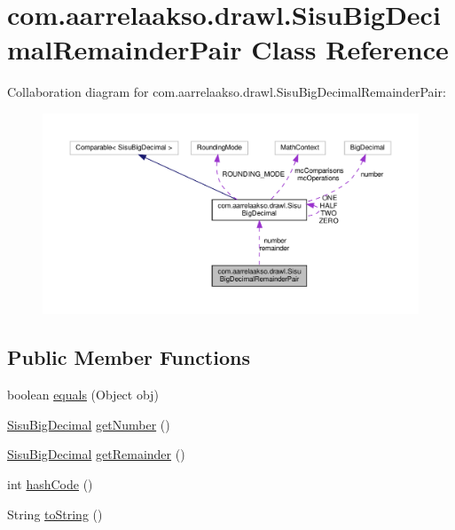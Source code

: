 \hypertarget{classcom_1_1aarrelaakso_1_1drawl_1_1_sisu_big_decimal_remainder_pair}{}\section{com.\+aarrelaakso.\+drawl.\+Sisu\+Big\+Decimal\+Remainder\+Pair Class Reference}
\label{classcom_1_1aarrelaakso_1_1drawl_1_1_sisu_big_decimal_remainder_pair}


Collaboration diagram for com.\+aarrelaakso.\+drawl.\+Sisu\+Big\+Decimal\+Remainder\+Pair\+:\nopagebreak
\begin{figure}[H]
\begin{center}
\leavevmode
\includegraphics[width=350pt]{classcom_1_1aarrelaakso_1_1drawl_1_1_sisu_big_decimal_remainder_pair__coll__graph}
\end{center}
\end{figure}
\subsection*{Public Member Functions}
\begin{DoxyCompactItemize}
\item 
boolean \hyperlink{classcom_1_1aarrelaakso_1_1drawl_1_1_sisu_big_decimal_remainder_pair_a911dcb06263e1bb7b3735b2795a9175f}{equals} (Object obj)
\item 
\hyperlink{classcom_1_1aarrelaakso_1_1drawl_1_1_sisu_big_decimal}{Sisu\+Big\+Decimal} \hyperlink{classcom_1_1aarrelaakso_1_1drawl_1_1_sisu_big_decimal_remainder_pair_ac2d403d156c6b95d3850d72117b9db3d}{get\+Number} ()
\item 
\hyperlink{classcom_1_1aarrelaakso_1_1drawl_1_1_sisu_big_decimal}{Sisu\+Big\+Decimal} \hyperlink{classcom_1_1aarrelaakso_1_1drawl_1_1_sisu_big_decimal_remainder_pair_a2dea512a765d3ca63baeb155bf5f2312}{get\+Remainder} ()
\item 
int \hyperlink{classcom_1_1aarrelaakso_1_1drawl_1_1_sisu_big_decimal_remainder_pair_a976651dc605ac114b1b8aac330d420ab}{hash\+Code} ()
\item 
String \hyperlink{classcom_1_1aarrelaakso_1_1drawl_1_1_sisu_big_decimal_remainder_pair_ac28afa59d19508fdbf2c1889c9fcd05e}{to\+String} ()
\end{DoxyCompactItemize}
